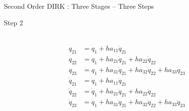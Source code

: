 \documentclass{beamer}
\begin{document}
\begin{frame}[allowframebreaks]{Second Order DIRK : Three Stages -- Three Steps}
\begin{block}{Step 2}
\begin{minipage}{1.0\textwidth}
\begin{minipage}{1.0\textwidth}
\begin{equation}
\begin{split}
          \end{split}
        \end{equation}
      \end{minipage}
    \end{minipage}
    \begin{minipage}{1.0\textwidth}
      \begin{equation}\nonumber
        \begin{split}
          q_{21} &= q_1 + h a_{11} \dot{q}_{21} \\
          q_{22} &= q_1 + h a_{21} \dot{q}_{21} + h a_{22} \dot{q}_{22} \\
          q_{23} &= q_1 + h a_{31} \dot{q}_{21} + h a_{32} \dot{q}_{22} + h a_{33} \dot{q}_{23} \\\hline
          \dot{q}_{21} &= \dot{q}_1 + h a_{11} \ddot{q}_{21} \\
          \dot{q}_{22} &= \dot{q}_1 + h a_{21} \ddot{q}_{21} + h a_{22} \ddot{q}_{22} \\
          \dot{q}_{23} &= \dot{q}_1 + h a_{31} \ddot{q}_{21} + h a_{32} \ddot{q}_{22} + h a_{33} \ddot{q}_{23} \\
        \end{split}
      \end{equation}
    \end{minipage}
  \end{block}

  \framebreak
  

\end{frame}
\end{document}
